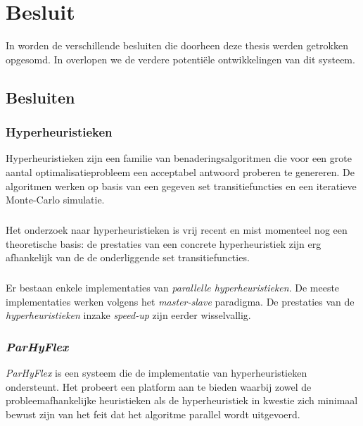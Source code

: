 \chapter{Besluit}
\label{besluit}


In  worden de verschillende besluiten die doorheen deze thesis werden getrokken opgesomd. In  overlopen we de verdere potenti\"ele ontwikkelingen van dit systeem.

\section{Besluiten}

\subsection{Hyperheuristieken}

Hyperheuristieken zijn een familie van benaderingsalgoritmen die voor een grote aantal optimalisatieprobleem een acceptabel antwoord proberen te genereren. De algoritmen werken op basis van een gegeven set transitiefuncties en een iteratieve Monte-Carlo simulatie.

\paragraph{}
Het onderzoek naar hyperheuristieken is vrij recent en mist momenteel nog een theoretische basis: de prestaties van een concrete hyperheuristiek zijn erg afhankelijk van de de onderliggende set transitiefuncties.

\paragraph{}
Er bestaan enkele implementaties van \emph{parallelle hyperheuristieken}. De meeste implementaties werken volgens het \emph{master-slave} paradigma. De prestaties van de \emph{hyperheuristieken} inzake \emph{speed-up} zijn eerder wisselvallig.

\subsection{\emph{ParHyFlex}}

\emph{ParHyFlex} is een systeem die de implementatie van hyperheuristieken ondersteunt. Het probeert een platform aan te bieden waarbij zowel de probleemafhankelijke heuristieken als de hyperheuristiek in kwestie zich minimaal bewust zijn van het feit dat het algoritme parallel wordt uitgevoerd.

